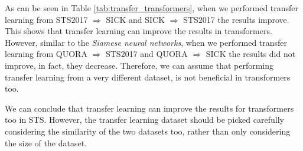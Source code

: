 \begin{table}[htb]
	\centering
	\caption[Results for transfer learning with Transformers]{Results for transfer learning with different Transformers. For each transfer learning experiment we show the difference between with transfer learning and without transfer learning. Non-grey values are the results of the experiments without transfer learning which we showed in the previous section too. We only report the Pearson correlation due to ease of visualisation.}  
	\label{tab:transfer_transformers}
\end{table}

As can be seen in Table \ref{tab:transfer_transformers}, when we performed transfer learning from STS2017 $\Rightarrow$ SICK and SICK $\Rightarrow$ STS2017 the results improve. This shows that transfer learning can improve the results in transformers. However, similar to the \textit{Siamese neural networks}, when we performed transfer learning from QUORA $\Rightarrow$ STS2017 and QUORA $\Rightarrow$ SICK the results did not improve, in fact, they decrease. Therefore, we can assume that  performing transfer learning from a very different dataset, is not beneficial in transformers too. 

We can conclude that transfer learning can improve the results for transformers too in STS. However, the transfer learning dataset should be picked carefully considering the similarity of the two datasets too, rather than only considering the size of the dataset.

